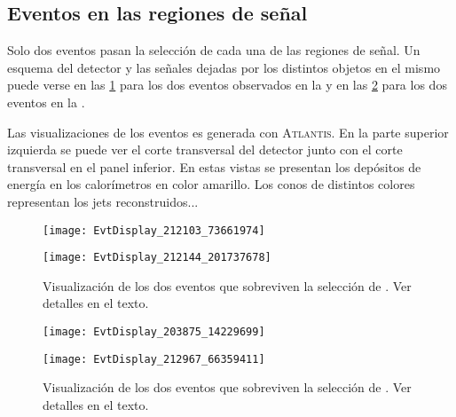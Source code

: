 


\subsection{Eventos en las regiones de señal}

Solo dos eventos pasan la
selección de cada una de las regiones de señal. Un esquema del detector y las
se\~nales dejadas por los distintos objetos en el mismo puede verse en las
\cref{fig:evdisplay_srl} para los dos eventos observados en la {\SRL} y en las
\cref{fig:evdisplay_srh} para los dos eventos en la {\SRH}.

Las visualizaciones de los eventos es generada con
\textsc{Atlantis}\cite{atlantis}.
En la parte superior izquierda se puede ver el corte transversal del detector
junto con el corte transversal en el panel inferior. En estas vistas se presentan
los depósitos de energía en los calorímetros en color amarillo. Los conos de
distintos colores representan los jets reconstruidos...



\begin{figure}[!htbp]
  \begin{center}

    \texttt{[image: EvtDisplay\_212103\_73661974]}

    \vspace{1cm}

    \texttt{[image: EvtDisplay\_212144\_201737678]}

    \caption{Visualización de los dos eventos que sobreviven la selección de {\SRL}. Ver detalles en el texto.}
    \label{fig:evdisplay_srl}
  \end{center}
\end{figure}


\begin{figure}[!htbp]
  \begin{center}

    \texttt{[image: EvtDisplay\_203875\_14229699]}

    \vspace{1cm}

    \texttt{[image: EvtDisplay\_212967\_66359411]}

  \caption{Visualización de los dos eventos que sobreviven la selección de {\SRH}. Ver detalles en el texto.}
  \label{fig:evdisplay_srh}
  \end{center}
\end{figure}


